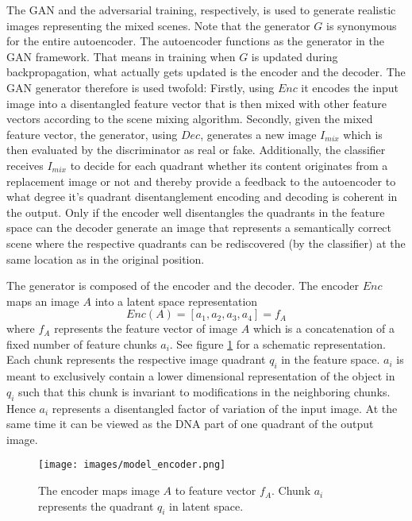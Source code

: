 \documentclass[12pt,a4paper]{article}
\begin{document}
The GAN and the adversarial training, respectively, is used to generate realistic images representing the mixed scenes. Note that the generator $G$ is synonymous for the entire autoencoder. The autoencoder functions as the generator in the GAN framework. That means in training when $G$ is updated during backpropagation, what actually gets updated is the encoder and the decoder. The GAN generator therefore is used twofold: Firstly, using $Enc$ it encodes the input image into a disentangled feature vector that is then mixed with other feature vectors according to the scene mixing algorithm. Secondly, given the mixed feature vector, the generator, using $Dec$, generates a new image $I_{mix}$ which is then evaluated by the discriminator as real or fake. Additionally, the classifier receives $I_{mix}$ to decide for each quadrant whether its content originates from a replacement image or not and thereby provide a feedback to the autoencoder to what degree it's quadrant disentanglement encoding and decoding is coherent in the output. Only if the encoder well disentangles the quadrants in the feature space can the decoder generate an image that represents a semantically correct scene where the respective quadrants can be rediscovered (by the classifier) at the same location as in the original position.

The generator is composed of the encoder and the decoder. The encoder $Enc$ maps an image $A$ into a latent space representation
\begin{equation} \label{eq:2}
    Enc(A) = [a_1, a_2, a_3, a_4] = f_A
\end{equation}
where $f_A$ represents the feature vector of image $A$ which is a concatenation of a fixed number of feature chunks $a_i$. See figure \ref{fig:encoder} for a schematic representation. Each chunk represents the respective image quadrant $q_i$ in the feature space. $a_i$ is meant to exclusively contain a lower dimensional representation of the object in $q_i$ such that this chunk is invariant to modifications in the neighboring chunks. Hence $a_i$ represents a disentangled factor of variation of the input image. At the same time it can be viewed as the DNA part of one quadrant of the output image.

\begin{figure}[h]
\centering
\texttt{[image: images/model\_encoder.png]}
\caption{The encoder maps image $A$ to feature vector $f_A$. Chunk $a_i$ represents the quadrant $q_i$ in latent space.}
\label{fig:encoder}
\end{figure}
\end{document}
